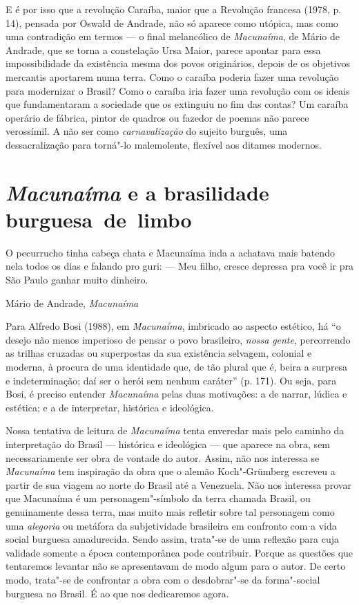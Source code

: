 E é por isso que a revolução Caraíba, maior que a Revolução francesa
(1978, p. 14), pensada por Oswald de Andrade, não só aparece como
utópica, mas como uma contradição em termos --- o final melancólico de
\emph{Macunaíma}, de Mário de Andrade, que se torna a constelação Ursa
Maior, parece apontar para essa impossibilidade da existência mesma dos
povos originários, depois de os objetivos mercantis aportarem numa
terra. Como o caraíba poderia fazer uma revolução para modernizar o
Brasil? Como o caraíba iria fazer uma revolução com os ideais que
fundamentaram a sociedade que os extinguiu no fim das contas? Um caraíba
operário de fábrica, pintor de quadros ou fazedor de poemas não parece
verossímil. A não ser como \emph{carnavalização} do sujeito burguês, uma
dessacralização para torná"-lo malemolente, flexível aos ditames
modernos.

\section{\emph{Macunaíma} e a brasilidade burguesa~de~limbo}

\epigraph{O pecurrucho tinha cabeça chata e Macunaíma inda a achatava mais batendo
nela todos os dias e falando pro guri:
--- Meu filho, cresce depressa pra você ir pra São Paulo ganhar muito
  dinheiro.}{Mário de Andrade, \emph{Macunaíma}}

Para Alfredo Bosi (1988), em \emph{Macunaíma}, imbricado ao aspecto
estético, há ``o desejo não menos imperioso de pensar o povo brasileiro,
\emph{nossa} \emph{gente}, percorrendo as trilhas cruzadas ou
superpostas da sua existência selvagem, colonial e moderna, à procura de
uma identidade que, de tão plural que é, beira a surpresa e
indeterminação; daí ser o herói sem nenhum caráter'' (p. 171). Ou seja,
para Bosi, é preciso entender \emph{Macunaíma} pelas duas motivações: a
de narrar, lúdica e estética; e a de interpretar, histórica e
ideológica.

Nossa tentativa de leitura de \emph{Macunaíma} tenta enveredar mais pelo
caminho da interpretação do Brasil --- histórica e ideológica --- que
aparece na obra, sem necessariamente ser obra de vontade do autor.
Assim, não nos interessa se \emph{Macunaíma} tem inspiração da obra que
o alemão Koch"-Grümberg escreveu a partir de sua viagem ao norte do
Brasil até a Venezuela. Não nos interessa provar que Macunaíma é um
personagem"-símbolo da terra chamada Brasil, ou genuinamente dessa terra,
mas muito mais refletir sobre tal personagem como uma \emph{alegoria} ou
metáfora da subjetividade brasileira em confronto com a vida social
burguesa amadurecida. Sendo assim, trata"-se de uma reflexão para cuja
validade somente a época contemporânea pode contribuir. Porque as
questões que tentaremos levantar não se apresentavam de modo algum para
o autor. De certo modo, trata"-se de confrontar a obra com o
desdobrar"-se da forma"-social burguesa no Brasil. É ao que nos
dedicaremos agora.

